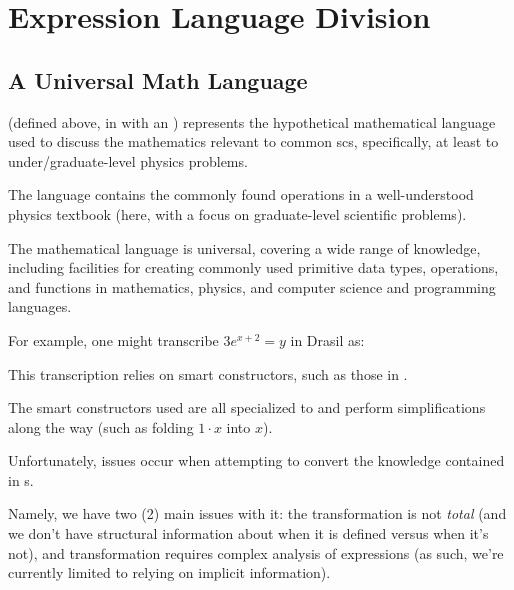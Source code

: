 \chapter{Expression Language Division}
\label{chap:lang-division}












\section{A Universal Math Language}
\label{sec:modelkinds:language}

\originalExprHaskell

\Expr{} (defined above, in  with an )
represents the hypothetical mathematical language used to discuss the
mathematics relevant to common \acs{scs}, specifically, at least to
under/graduate-level physics problems.

The language contains the commonly found operations in a well-understood physics
textbook (here, with a focus on graduate-level scientific problems).

The mathematical language is universal, covering a wide range of knowledge,
including facilities for creating commonly used primitive data types,
operations, and functions  in mathematics, physics, and computer science and
programming languages.

For example, one might transcribe \(3 e^{x + 2} = y\) in Drasil as:

\pseudoExampleExpression{}

This transcription relies on smart constructors, such as those in
.

The smart constructors used are all specialized to \Expr{} and perform
simplifications along the way (such as folding \(1 \cdot x\) into \(x\)).











Unfortunately, issues occur when attempting to convert the knowledge contained
in \RelationConcept{}s.

Namely, we have two (2) main issues with it: the transformation is not
\textit{total} (and we don't have structural information about when it is
defined versus when it's not), and transformation requires complex analysis of
expressions (as such, we're currently limited to relying on implicit
information).

